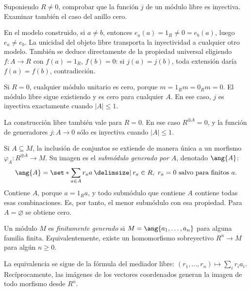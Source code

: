 \begin{ejer}\label{ejer:C14-generadores}
Suponiendo $R\ne0$, comprobar que la función $j$ de un módulo libre es inyectiva. Examinar también el caso del anillo cero.
\end{ejer}
\begin{sol}
En el modelo construido, si $a\ne b$, entonces $e_a(a)=1_R\ne0=e_b(a)$, luego $e_a\ne e_b$. La unicidad del objeto libre transporta la inyectividad a cualquier otro modelo. También se deduce directamente de la propiedad universal eligiendo $f:A\to R$ con $f(a)=1_R$, $f(b)=0$: si $j(a)=j(b)$, toda extensión daría $f(a)=f(b)$, contradicción.

Si $R=0$, cualquier módulo unitario es cero, porque $m=1_Rm=0_Rm=0$. El módulo libre sigue existiendo y es cero para cualquier $A$. En ese caso, $j$ es inyectiva exactamente cuando $|A|\leq1$.
\end{sol}
\begin{obs}
La construcción libre también vale para $R=0$. En ese caso $R^{\oplus A}=0$, y la función de generadores $j:A\to0$ sólo es inyectiva cuando $|A|\leq1$.
\end{obs}

Si $A\subseteq M$, la inclusión de conjuntos se extiende de manera única a un morfismo $\varphi_A:R^{\oplus A}\to M$. Su imagen es el \emph{submódulo generado por $A$}, denotado $\ang{A}$:
\[
\ang{A}=\set*{\sum_{a\in A}r_aa\given
 r_a\in R,\ r_a=0\text{ salvo para finitos }a}.
\]
Contiene $A$, porque $a=1_Ra$, y todo submódulo que contiene $A$ contiene todas esas combinaciones. Es, por tanto, el menor submódulo con esa propiedad. Para $A=\varnothing$ se obtiene cero.

\begin{defi}
Un módulo $M$ es \emph{finitamente generado} si $M=\ang{a_1,\ldots,a_n}$ para alguna familia finita. Equivalentemente, existe un homomorfismo sobreyectivo $R^n\to M$ para algún $n\geq0$.
\end{defi}
La equivalencia se sigue de la fórmula del mediador libre: $(r_1,\ldots,r_n)\mapsto\sum_i r_ia_i$. Recíprocamente, las imágenes de los vectores coordenados generan la imagen de todo morfismo desde $R^n$.
